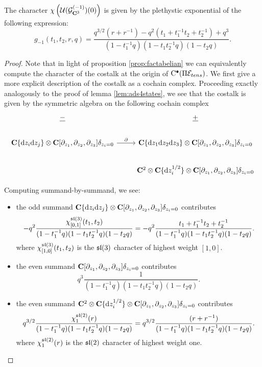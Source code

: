 \documentclass[../main.tex]{subfiles}
\begin{document}
\begin{prop}
\label{prop:6done}
The character $\chi \left ( \mathcal{U} (\mathcal{G}^{(-1)}_{\mathbf{C}^3} ) (0)\right )$ is given by the plethystic exponential of the following expression:
\begin{equation}\label{eqn:6done}
g_{-1} (t_1,t_2,r,q) = \frac{q^{3/2}(r + r^{-1}) - q^2(t_1 + t_1^{-1} t_2 + t_2^{-1} ) + q^3}{(1-t_1^{-1}q) (1-t_1 t_2^{-1} q) (1-t_2 q)} .
\end{equation}
\end{prop}
\begin{proof}
Note that in light of proposition \ref{prop:factabelian} we can equivalently compute the character of the costalk at the origin of ${\mathrm{C}}^\bullet (\Pi \mathcal{E}_{tens})$. We first give a more explicit description of the costalk as a cochain complex. Proceeding exactly analogously to the proof of lemma \ref{lem:ads4states}, we see that the costalk is given by the symmetric algebra on the following cochain complex
\[
\begin{tikzcd}
\ul{-} & \ul{+}\\
\C\{\d z_i\d z_j\} \otimes \C [\del_{z_1}, \del_{z_2}, \del_{z_3}]\delta_{z_i = 0} \ar[r,"\del"] & \C\{\d z_1\d z_2\d z_3\} \otimes \C [\del_{z_1}, \del_{z_2}, \del_{z_3}]\delta_{z_i = 0} \\
& \C^2\otimes \C\{\d z_i^{1/2}\} \otimes \C [\del_{z_1}, \del_{z_2}, \del_{z_3}]\delta_{z_i = 0} 
\end{tikzcd}
\]

Computing summand-by-summand, we see:
\begin{itemize}
\item the odd summand $\mathbf{C}\{\mathrm{d} z_i\mathrm{d} z_j\} \otimes \mathbf{C} [\partial_{z_1}, \partial_{z_2}, \partial_{z_3}]\delta_{z_i = 0}$ contributes
\[
- q^2 \frac{\chi^{\mathfrak{sl}(3)}_{[0,1]}(t_1,t_2)}{(1-t_1^{-1}q) (1-t_1 t_2^{-1} q) (1-t_2 q)} = - q^2 \frac{t_1  + t_1^{-1} t_2  + t_2^{-1} }{(1-t_1^{-1}q) (1-t_1 t_2^{-1} q) (1-t_2 q)}.
\]
where $\chi^{\mathfrak{sl}(3)}_{[1,0]}(t_1,t_2)$ is the $\mathfrak{sl}(3)$ character of highest weight $[1,0]$.
\item the even summand $\mathbf{C} [\partial_{z_1}, \partial_{z_2}, \partial_{z_3}]\delta_{z_i = 0}$ contributes
\[
q^3 \frac{1}{(1-t_1^{-1}q) (1-t_1 t_2^{-1} q) (1-t_2 q)}.
\]
\item the even summand $\mathbf{C}^2\otimes \mathbf{C}\{\mathrm{d} z_i^{1/2}\} \otimes \mathbf{C} [\partial_{z_1}, \partial_{z_2}, \partial_{z_3}]\delta_{z_i = 0}$ contributes
\[
q^{3/2} \frac{\chi_{1}^{\mathfrak{sl}(2)} (r)}{(1-t_1^{-1}q) (1-t_1 t_2^{-1} q) (1-t_2 q)} = q^{3/2}\frac{(r + r^{-1})}{(1-t_1^{-1}q) (1-t_1 t_2^{-1} q) (1-t_2 q)}.
\]
where $\chi_{1}^{\mathfrak{sl}(2)} (r)$ is the $\mathfrak{sl}(2)$ character of highest weight one.
\end{itemize}
\end{proof}
\end{document}
